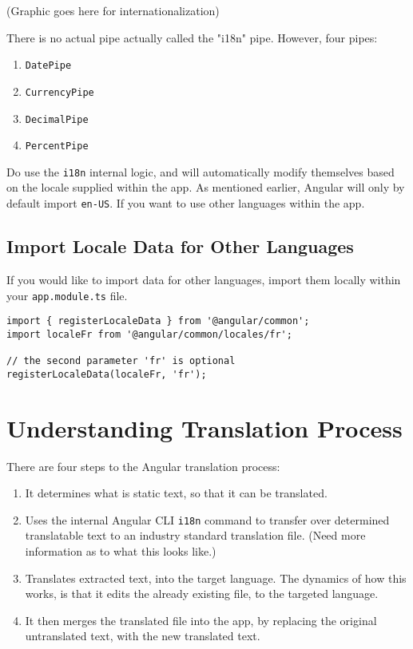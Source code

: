 (Graphic goes here for internationalization)

There is no actual pipe actually called the "i18n" pipe. However, four pipes: 
\begin{enumerate}
  \item \lstinline{DatePipe}
  \item \lstinline{CurrencyPipe}
  \item \lstinline{DecimalPipe}
  \item \lstinline{PercentPipe}
\end{enumerate}

Do use the \lstinline{i18n} internal logic, and will automatically modify 
themselves based on the locale supplied within the app. As mentioned earlier,
Angular will only by default import \lstinline{en-US}. If you want to use other
languages within the app. 

\subsection{Import Locale Data for Other Languages}
If you would like to import data for other languages, import them locally 
within your \lstinline{app.module.ts} file. 

\begin{lstlisting}[caption=app.module.ts]
import { registerLocaleData } from '@angular/common';
import localeFr from '@angular/common/locales/fr';

// the second parameter 'fr' is optional
registerLocaleData(localeFr, 'fr');
\end{lstlisting}

\section{ Understanding Translation Process }
There are four steps to the Angular translation process: 
\begin{enumerate}
  \item It determines what is static text, so that it can be translated.
  \item Uses the internal Angular CLI \lstinline{i18n} command to transfer over 
  determined translatable text to an industry standard translation file. (Need 
  more information as to what this looks like.)
  \item Translates extracted text, into the target language. The dynamics of
  how this works, is that it edits the already existing file, to the targeted 
  language. 
  \item It then merges the translated file into the app, by replacing the 
  original untranslated text, with the new translated text. 
\end{enumerate}

